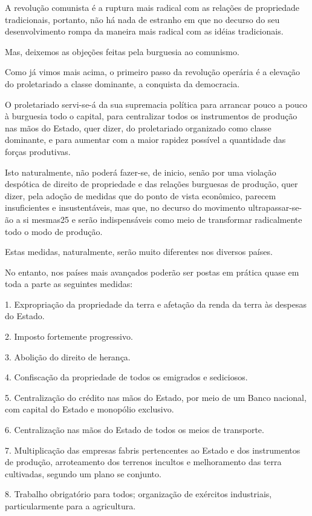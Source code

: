 A revolução comunista é a ruptura mais radical com as relações de
propriedade tradicionais, portanto, não há nada de estranho em que no
decurso do seu desenvolvimento rompa da maneira mais radical com as
idéias tradicionais.

Mas, deixemos as objeções feitas pela burguesia ao comunismo.

Como já vimos mais acima, o primeiro passo da revolução operária é a
elevação do proletariado a classe dominante, a conquista da
democracia.

O proletariado servi-se-á da sua supremacia política para arrancar
pouco a pouco à burguesia todo o capital, para centralizar todos os
instrumentos de produção nas mãos do Estado, quer dizer, do
proletariado organizado como classe dominante, e para aumentar com a
maior rapidez possível a quantidade das forças produtivas.

Isto naturalmente, não poderá fazer-se, de inicio, senão por uma
violação despótica de direito de propriedade e das relações burguesas
de produção, quer dizer, pela adoção de medidas que do ponto de vista
econômico, parecem insuficientes e insustentáveis, mas que, no decurso
do movimento ultrapassar-se-ão a si mesmas25 e serão indispensáveis
como meio de transformar radicalmente todo o modo de produção.

Estas medidas, naturalmente, serão muito diferentes nos diversos
países.

No entanto, nos países mais avançados poderão ser postas em prática
quase em toda a parte as seguintes medidas:

1. Expropriação da propriedade da terra e afetação da renda da terra
às despesas do Estado.

2. Imposto fortemente progressivo.

3. Abolição do direito de herança.

4. Confiscação da propriedade de todos os emigrados e sediciosos.

5. Centralização do crédito nas mãos do Estado, por meio de um Banco
nacional, com capital do Estado e monopólio exclusivo.

6. Centralização nas mãos do Estado de todos os meios de transporte.

7. Multiplicação das empresas fabris pertencentes ao Estado e dos
instrumentos de produção, arroteamento dos terrenos incultos e
melhoramento das terra cultivadas, segundo um plano se conjunto.

8. Trabalho obrigatório para todos; organização de exércitos
industriais, particularmente para a agricultura.

